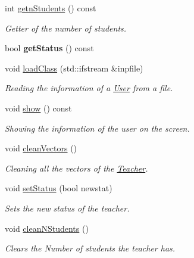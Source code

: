 \begin{DoxyCompactItemize}
int \mbox{\hyperlink{class_teacher_a430db21f5ff329759302fbd35b6c365c}{getn\+Students}} () const
\begin{DoxyCompactList}\small\item\em Getter of the number of students. \end{DoxyCompactList}\item 
\mbox{\label{class_teacher_add422087b1f81cb38ad844634f5ca56c}} 
bool {\bfseries get\+Status} () const
\item 
void \mbox{\hyperlink{class_teacher_a1f204644af41c43ff3bd0582393062fa}{load\+Class}} (std\+::ifstream \&inpfile)
\begin{DoxyCompactList}\small\item\em Reading the information of a \mbox{\hyperlink{class_user}{User}} from a file. \end{DoxyCompactList}\item 
\mbox{\label{class_teacher_a1ea5c51b89ef4fe2098f4426217fc705}} 
void \mbox{\hyperlink{class_teacher_a1ea5c51b89ef4fe2098f4426217fc705}{show}} () const
\begin{DoxyCompactList}\small\item\em Showing the information of the user on the screen. \end{DoxyCompactList}\item 
\mbox{\label{class_teacher_ad8093070d9bf4c7663e4b7727576ab7a}} 
void \mbox{\hyperlink{class_teacher_ad8093070d9bf4c7663e4b7727576ab7a}{clean\+Vectors}} ()
\begin{DoxyCompactList}\small\item\em Cleaning all the vectors of the \mbox{\hyperlink{class_teacher}{Teacher}}. \end{DoxyCompactList}\item 
void \mbox{\hyperlink{class_teacher_a024a7daf22ee3ac310b69ba72fda5bb3}{set\+Status}} (bool newstat)
\begin{DoxyCompactList}\small\item\em Sets the new status of the teacher. \end{DoxyCompactList}\item 
\mbox{\label{class_teacher_a71778db05a63e32b33234bb7dcfb77fc}} 
void \mbox{\hyperlink{class_teacher_a71778db05a63e32b33234bb7dcfb77fc}{clean\+N\+Students}} ()
\begin{DoxyCompactList}\small\item\em Clears the Number of students the teacher has. \end{DoxyCompactList}\item 

\end{DoxyCompactItemize}
